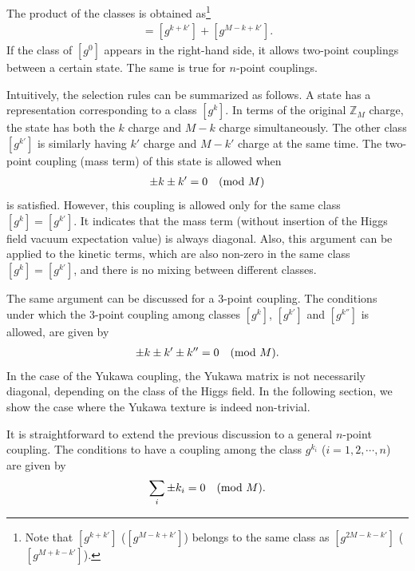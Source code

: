 \documentclass[a4paper,11pt]{article}
\numberwithin{equation}{section}
\begin{document}
The product of the classes is obtained as\footnote{Note that $[g^{k+k'}]$ ($[g^{M-k+k'}]$) belongs to the same class as $[g^{2M-k-k'}]$ ($[g^{M+k-k'}]$).} 
\begin{align}
[g^k][g^{k'}]=[g^{k+k'}]+[g^{M-k+k'}].
\end{align}
If the class of $[g^0]$ appears in the right-hand side, it 
allows two-point couplings between a certain state. 
The same is true for $n$-point couplings.


Intuitively, the selection rules can be summarized as follows. 
A state has a representation corresponding to a class $[g^k]$.
In terms of the original $\mathbb{Z}_M$ charge, 
the state has both the $k$ charge and $M-k$ charge simultaneously.
The other class $[g^{k'}]$ is similarly 
having $k'$ charge and $M-k'$ charge at the same time. 
The two-point coupling (mass term) of this state is 
allowed when
\begin{align}
\pm k \pm k'=0 \quad ({\rm mod}~M)
\end{align}
is satisfied. 
However, this coupling is allowed only for the same class $[g^k]=[g^{k'}]$. 
It indicates that the mass term (without insertion of the Higgs field vacuum expectation value) is always diagonal. 
Also, this argument can be applied to the kinetic terms, 
which are also non-zero in the same class $[g^k]=[g^{k'}]$, 
and there is no mixing between different classes. 


The same argument can be discussed for a 3-point coupling. 
The conditions under which the 3-point coupling among classes $[g^k]$, $[g^{k'}]$ and $[g^{k''}]$ is allowed,  are given by
\begin{align}
\pm k \pm k' \pm k''=0 \quad ({\rm mod}~M).
\end{align}
In the case of the Yukawa coupling, the Yukawa matrix is not necessarily diagonal, depending on the class of the Higgs field. 
In the following section, we show the case where the Yukawa texture is indeed non-trivial. 


It is straightforward to extend the previous discussion to a general $n$-point coupling. 
The conditions to have a coupling among the class $g^{k_i}$ ($i=1,2,\cdots, n$) are given by
\begin{align}
\sum_i \pm k_i = 0 \quad ({\rm mod}~M).
\end{align}
\end{document}
